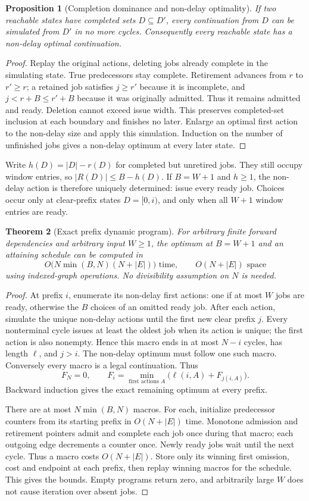 \documentclass[11pt]{article}
\newtheorem{theorem}{Theorem}
\newtheorem{proposition}[theorem]{Proposition}
\begin{document}
\begin{proposition}[Completion dominance and non-delay optimality]
If two reachable states have completed sets $D\subseteq D'$, every
continuation from $D$ can be simulated from $D'$ in no more cycles.
Consequently every reachable state has a non-delay optimal continuation.
\end{proposition}
\begin{proof}
Replay the original actions, deleting jobs already complete in the simulating
state. True predecessors stay complete. Retirement advances from $r$ to
$r'\ge r$; a retained job satisfies $j\ge r'$ because it is incomplete, and
$j<r+B\le r'+B$ because it was originally admitted. Thus it remains admitted
and ready. Deletion cannot exceed issue width. This preserves completed-set
inclusion at each boundary and finishes no later. Enlarge an optimal first
action to the non-delay size and apply this simulation. Induction on the
number of unfinished jobs gives a non-delay optimum at every later state.
\end{proof}

Write $h(D)=|D|-r(D)$ for completed but unretired jobs. They still occupy
window entries, so $|R(D)|\le B-h(D)$. If $B=W+1$ and $h\ge1$, the
non-delay action is therefore uniquely determined: issue every ready job.
Choices occur only at clear-prefix states $D=[0,i)$, and only when all
$W+1$ window entries are ready.

\begin{theorem}[Exact prefix dynamic program]
For arbitrary finite forward dependencies and arbitrary input $W\ge1$,
the optimum at $B=W+1$ and an attaining schedule can be computed in
\[
 O\bigl(N\min(B,N)(N+|E|)\bigr)\text{ time},\qquad O(N+|E|)\text{ space}
\]
using indexed-graph operations. No divisibility assumption on $N$ is needed.
\end{theorem}
\begin{proof}
At prefix $i$, enumerate its non-delay first actions: one if at most $W$
jobs are ready, otherwise the $B$ choices of an omitted ready job.
After each action, simulate the unique non-delay actions until the first
new clear prefix $j$. Every nonterminal cycle issues at least the oldest
job when its action is unique; the first action is also nonempty. Hence
this macro ends in at most $N-i$ cycles, has length $\ell$, and $j>i$.
The non-delay optimum must follow one such macro. Conversely every macro
is a legal continuation. Thus
\[
 F_N=0,\qquad F_i=\min_{\text{first actions }A}
       \bigl(\ell(i,A)+F_{j(i,A)}\bigr).
\]
Backward induction gives the exact remaining optimum at every prefix.

There are at most $N\min(B,N)$ macros. For each, initialize predecessor
counters from its starting prefix in $O(N+|E|)$ time. Monotone admission
and retirement pointers admit and complete each job once during that macro;
each outgoing edge decrements a counter once. Newly ready jobs wait until
the next cycle. Thus a macro costs $O(N+|E|)$. Store only its winning first
omission, cost and endpoint at each prefix, then replay winning macros for
the schedule. This gives the bounds. Empty programs return zero, and
arbitrarily large $W$ does not cause iteration over absent jobs.
\end{proof}
\end{document}
